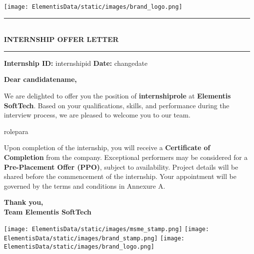 \documentclass[a4paper,12pt]{article}
\begin{document}
\begin{center}
    \texttt{[image: ElementisData/static/images/brand\_logo.png]}
\end{center}

\begin{center}
    \vspace{0.5cm}
    \rule{\textwidth}{1pt} \\[0.3cm]
    {\LARGE \textbf{INTERNSHIP OFFER LETTER}} \\[0.3cm]
    \rule{\textwidth}{1pt}
\end{center}

\vspace{0.5cm}

\noindent
\textbf{Internship ID:} internshipid \hfill \textbf{Date:} changedate

\vspace{0.5cm}
\noindent
\textbf{Dear candidatename,}

\vspace{0.5cm}
We are delighted to offer you the position of \textbf{internshiprole} at \textbf{Elementis SoftTech}. Based on your qualifications, skills, and performance during the interview process, we are pleased to welcome you to our team.

\vspace{0.5cm}
rolepara

\vspace{0.5cm}
Upon completion of the internship, you will receive a \textbf{Certificate of Completion} from the company. Exceptional performers may be considered for a \textbf{Pre-Placement Offer (PPO)}, subject to availability. Project details will be shared before the commencement of the internship. Your appointment will be governed by the terms and conditions in Annexure A.

\vspace{1cm}
\noindent
\textbf{Thank you,} \\
\textbf{Team Elementis SoftTech}

\vspace{1cm}

\begin{center}
    \texttt{[image: ElementisData/static/images/msme\_stamp.png]} \hspace{0.5cm}
    \texttt{[image: ElementisData/static/images/brand\_stamp.png]} \hspace{0.5cm}
    \texttt{[image: ElementisData/static/images/brand\_logo.png]}
\end{center}
\end{document}
